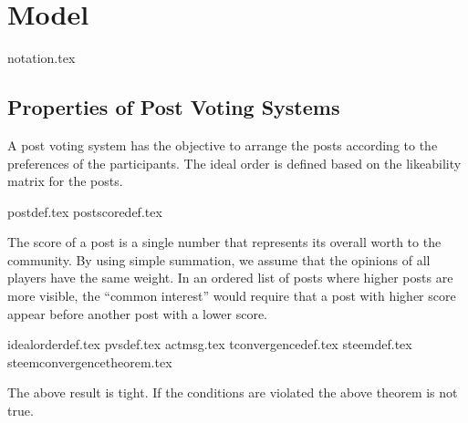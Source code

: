 \section{Model}
  {notation.tex}
  \subsection{Properties of Post Voting Systems}
    A post voting system has the objective to arrange the posts according to the
    preferences of the participants. The ideal order is defined based on the
    likeability matrix for the posts.

    {postdef.tex}
    {postscoredef.tex}

    The score of a post is a single number that represents its overall worth to
    the community. By using simple summation, we assume that the opinions of all
    players have the same weight. In an ordered list of posts where higher posts
    are more visible, the ``common interest'' would require that a post with
    higher score appear before another post with a lower score.

    {idealorderdef.tex}
    {pvsdef.tex}
    {actmsg.tex}
    {tconvergencedef.tex}
    {steemdef.tex}
    {steemconvergencetheorem.tex}

    The above result is tight.
    If the conditions are violated the above theorem is not true.
